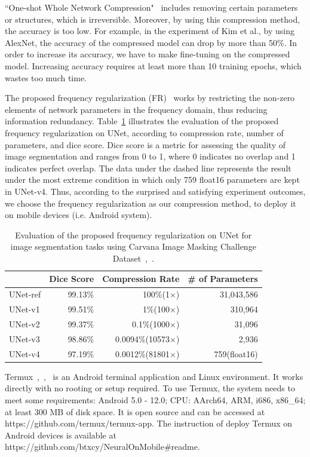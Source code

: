 \documentclass[conference]{IEEEtran}
\begin{document}
``One-shot Whole Network Compression"~\cite{kim2016oneshot} includes removing certain parameters or structures, which is irreversible. Moreover, by using this compression method, the accuracy is too low. For example, in the experiment of Kim et al., by using AlexNet, the accuracy of the compressed model can drop by more than 50\%. In order to increase its accuracy, we have to make fine-tuning on the compressed model. Increasing accuracy requires at least more than 10 training epochs, which wastes too much time.

The proposed frequency regularization (FR)~\cite{zhao2023fr} works by restricting the non-zero elements of network parameters in the frequency domain, thus reducing information redundancy. Table~\ref{table:fr_unet} illustrates the evaluation of the proposed frequency regularization on UNet, according to compression rate, number of parameters, and dice score. Dice score is a metric for assessing the quality of image segmentation and ranges from 0 to 1, where 0 indicates no overlap and 1 indicates perfect overlap. The data under the dashed line represents the result under the most extreme condition in which only 759 float16 parameters are kept in UNet-v4. Thus, according to the surprised and satisfying experiment outcomes, we choose the frequency regularization as our compression method, to deploy it on mobile devices (i.e. Android system).

\begin{table}[H]
	\caption{Evaluation of the proposed frequency regularization on UNet for image segmentation tasks using Carvana Image Masking Challenge Dataset~\cite{zhao2023fr},~\cite{brian2017carvanadataset}.} 
	\label{table:fr_unet}
	\small
	\centering
	\begin{tabular}{p{1.15cm}rrr}
		\toprule
		&Dice Score&Compression Rate&\# of Parameters\\ 
		\midrule\midrule
		UNet-ref&99.13\%&100\%(1×)&31,043,586\\
		UNet-v1&99.51\%&1\%(100×)&310,964\\
		UNet-v2&99.37\%&0.1\%(1000×)&31,096\\
		UNet-v3&98.86\%&0.0094\%(10573×)&2,936\\
		\cdashline{1-4}
		UNet-v4&97.19\%&0.0012\%(81801×)&759(float16)\\
		\bottomrule
	\end{tabular}
\end{table}

Termux~\cite{termux_repo},~\cite{termux_overview},~\cite{termux_wiki}  is an Android terminal application and Linux environment. It works directly with no rooting or setup required. To use Termux, the system needs to meet some requirements: Android 5.0 - 12.0; CPU: AArch64, ARM, i686, x86\_64; at least 300 MB of disk space. It is open source and can be accessed at https://github.com/termux/termux-app. The instruction of deploy Termux on Android devices is available at https://github.com/btxcy/NeuralOnMobile\#readme. 
\end{document}
